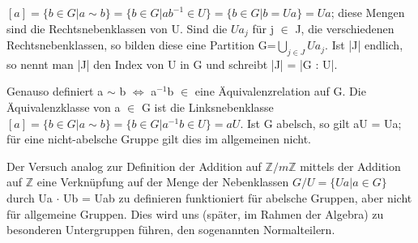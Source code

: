 $[a]=\{ b \in G | a \sim b \} = \{ b \in G | ab^{-1} \in U \} = \{ b \in G | b = Ua \} = Ua$; 
diese Mengen sind die Rechtsnebenklassen von U. Sind die $Ua_j$ für j $\in$ J, die verschiedenen Rechtsnebenklassen, so bilden diese eine Partition G=$\bigcup\limits_{j \in J} Ua_j$.
Ist |J| endlich, so nennt man |J| den Index von U in G und schreibt |J| = |G : U|.
\begin{compactitem}
\item Genauso definiert a $\sim$ b $\Leftrightarrow$ a$^{-1}$b $\in$ eine Äquivalenzrelation auf G. Die Äquivalenzklasse von a $\in$ G ist die Linksnebenklasse $[a] = \{b \in G | a \sim b \} = \{ b \in G | a^{-1}b \in U \} = aU$. 
Ist G abelsch, so gilt aU = Ua; für eine nicht-abelsche Gruppe gilt dies im allgemeinen nicht.
\item Der Versuch analog zur Definition der Addition auf $\mathbb{Z}/m\mathbb{Z}$ mittels der Addition auf $\mathbb{Z}$ eine Verknüpfung auf der Menge der Nebenklassen $G/U = \{Ua | a \in G\}$ durch Ua $\cdot$ Ub = Uab zu definieren funktioniert für abelsche Gruppen, aber nicht für allgemeine Gruppen. Dies wird uns (später, im Rahmen der Algebra) zu besonderen Untergruppen führen, den sogenannten Normalteilern.
\end{compactitem}
